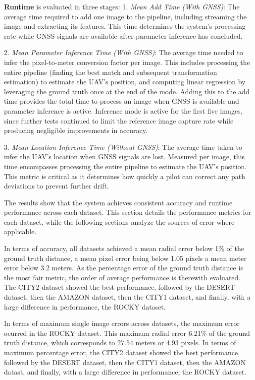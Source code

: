 \textbf{Runtime} is evaluated in three stages:
1. \textit{Mean Add Time (With GNSS)}: The average time required to add one image to the pipeline, including streaming the image and extracting its features. This time determines the system's processing rate while GNSS signals are available after parameter inference has concluded.

2. \textit{Mean Parameter Inference Time (With GNSS)}: The average time needed to infer the pixel-to-meter conversion factor per image. This includes processing the entire pipeline (finding the best match and subsequent transformation estimation) to estimate the UAV's position, and computing linear regression by leveraging the ground truth once at the end of the mode. Adding this to the add time provides the total time to process an image when GNSS is available and parameter inference is active. Inference mode is active for the first five images, since further tests continued to limit the reference image capture rate while producing negligible improvements in accuracy.

3. \textit{Mean Location Inference Time (Without GNSS)}: The average time taken to infer the UAV's location when GNSS signals are lost. Measured per image, this time encompasses processing the entire pipeline to estimate the UAV's position. This metric is critical as it determines how quickly a pilot can correct any path deviations to prevent further drift.


The results show that the system achieves consistent accuracy and runtime performance across each dataset. This section details the performance metrics for each dataset, while the following sections analyze the sources of error where applicable.

In terms of accuracy, all datasets achieved a mean radial error below 1\% of the ground truth distance, a mean pixel error being below 1.05 pixels a mean meter error below 3.2 meters. As the percentage error of the ground truth distance is the most fair metric, the order of average performance is therewith evaluated. The CITY2 dataset showed the best performance, followed by the DESERT dataset, then the AMAZON dataset, then the CITY1 dataset, and finally, with a large difference in performance, the ROCKY dataset. 

In terms of maximum single image errors across datasets, the maximum error ocurred in the ROCKY dataset. This maximum radial error 6.21\% of the ground truth distance, which corresponds to 27.54 meters or 4.93 pixels. In terms of maximum percentage error, the CITY2 dataset showed the best performance, followed by the DESERT dataset, then the CITY1 dataset, then the AMAZON datast, and finally, with a large difference in performance, the ROCKY dataset.


